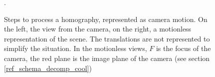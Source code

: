 \begin{figure}
		\caption{Steps to process a homography, represented as camera motion. On the left, the view from the camera, on the right, a motionless representation of the scene. The translations are not represented to simplify the situation. In the motionless views, $F$ is the focus of the camera, the red plane is the image plane of the camera (see section \ref{ref_schema_decomp_cool})}.
		\label{schema_decomp_cool}
		\label{SchemaEtapesDecompoGeometrique}
	\end{figure}
	\clearpage

